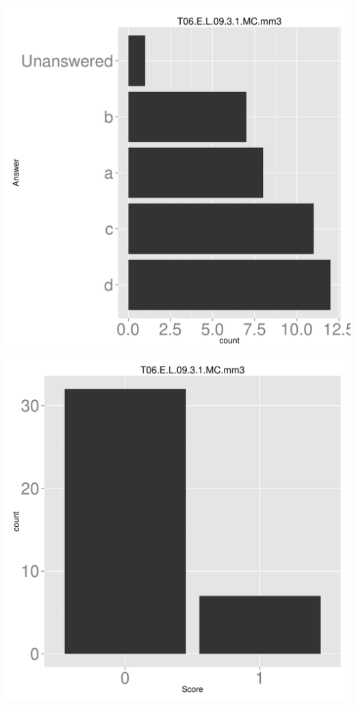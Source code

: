 \documentclass[12pt,nohyper]{tufte-handout}\usepackage[]{graphicx}\usepackage[]{color}
\begin{document}
\begin{center} \includegraphics[width=.45\linewidth]{Topic06_41_answer} \includegraphics[width=.45\linewidth]{Topic06_41_score} \end{center} 
\end{document}
